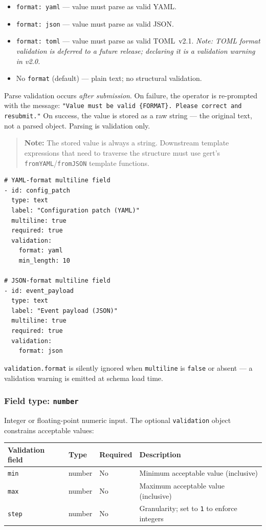 \begin{itemize}
  \item \texttt{format: yaml} — value must parse as valid YAML.
  \item \texttt{format: json} — value must parse as valid JSON.
  \item \texttt{format: toml} — value must parse as valid TOML~v2.1.
        \emph{Note: TOML format validation is deferred to a future release;
        declaring it is a validation warning in v2.0.}
  \item No \texttt{format} (default) — plain text; no structural validation.
\end{itemize}

Parse validation occurs \emph{after submission}.  On failure, the operator
is re-prompted with the message:
\texttt{"Value must be valid \{FORMAT\}.  Please correct and resubmit."}
On success, the value is stored as a raw string — the original text, not a
parsed object.  Parsing is validation only.

\begin{quote}
\textbf{Note:} The stored value is always a string.  Downstream template
expressions that need to traverse the structure must use gert's
\texttt{fromYAML}/\texttt{fromJSON} template functions.
\end{quote}

\begin{verbatim}
# YAML-format multiline field
- id: config_patch
  type: text
  label: "Configuration patch (YAML)"
  multiline: true
  required: true
  validation:
    format: yaml
    min_length: 10

# JSON-format multiline field
- id: event_payload
  type: text
  label: "Event payload (JSON)"
  multiline: true
  required: true
  validation:
    format: json
\end{verbatim}

\texttt{validation.format} is silently ignored when \texttt{multiline} is
\texttt{false} or absent — a validation warning is emitted at schema load
time.

\subsubsection{Field type: \texttt{number}}
\label{subsubsec:field-number}

Integer or floating-point numeric input.  The optional \texttt{validation}
object constrains acceptable values:

\begin{center}
\begin{tabular}{lllp{5cm}}
\hline
\textbf{Validation field} & \textbf{Type} & \textbf{Required} & \textbf{Description} \\
\hline
\texttt{min}  & number  & No & Minimum acceptable value (inclusive) \\
\texttt{max}  & number  & No & Maximum acceptable value (inclusive) \\
\texttt{step} & number  & No & Granularity; set to \texttt{1} to enforce integers \\
\hline
\end{tabular}
\end{center}

